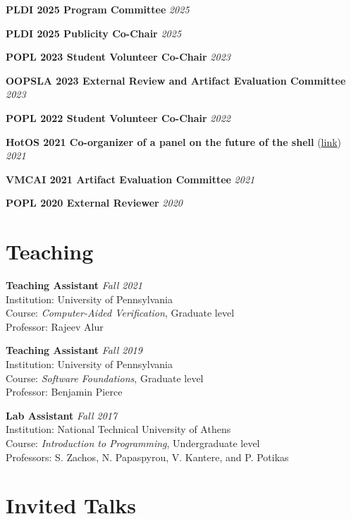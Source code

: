 \documentclass[margin]{res}
\begin{document}
\begin{resume}
\textbf{PLDI 2025 Program Committee}  \hfill {\em 2025}

\textbf{PLDI 2025 Publicity Co-Chair}  \hfill {\em 2025}

\textbf{POPL 2023 Student Volunteer Co-Chair}  \hfill {\em 2023}

\textbf{OOPSLA 2023 External Review and Artifact Evaluation Committee}  \hfill {\em 2023}

\textbf{POPL 2022 Student Volunteer Co-Chair}  \hfill {\em 2022}

\textbf{HotOS 2021 Co-organizer of a panel on the future of the shell} (\href{https://fut-shell.github.io/}{link})  \hfill {\em 2021}

\textbf{VMCAI 2021 Artifact Evaluation Committee}  \hfill {\em 2021}

\textbf{POPL 2020 External Reviewer}  \hfill {\em 2020}

\section{Teaching}
\hypertarget{sec:teaching}{}

\textbf{Teaching Assistant}  \hfill {\em Fall 2021} \\
Institution: University of Pennsylvania \\
Course: \textit{Computer-Aided Verification}, Graduate level \\
Professor: Rajeev Alur

\textbf{Teaching Assistant}  \hfill {\em Fall 2019} \\
Institution: University of Pennsylvania \\
Course: \textit{Software Foundations}, Graduate level \\
Professor: Benjamin Pierce

\textbf{Lab Assistant}  \hfill {\em Fall 2017} \\
Institution: National Technical University of Athens \\
Course: \textit{Introduction to Programming}, Undergraduate level \\
Professors: S. Zachos, N. Papaspyrou, V. Kantere, and P. Potikas


\section{Invited Talks}
\hypertarget{sec:talks}{}





\end{resume}
\end{document}
